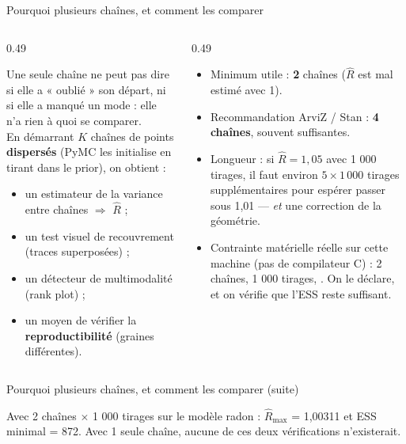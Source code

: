 \begin{frame}{Pourquoi plusieurs chaînes, et comment les comparer}
\begin{columns}[t]
\begin{column}{0.49\textwidth}
\begin{ebox}[Le principe]
Une seule chaîne ne peut pas dire si elle a « oublié » son départ, ni si elle a
manqué un mode : elle n'a rien à quoi se comparer.
\\[1mm]
En démarrant $K$ chaînes de points \textbf{dispersés} (PyMC les initialise en
tirant dans le prior), on obtient :
\begin{itemize}
  \item un estimateur de la variance entre chaînes $\Rightarrow$ $\hat R$ ;
  \item un test visuel de recouvrement (traces superposées) ;
  \item un détecteur de multimodalité (rank plot) ;
  \item un moyen de vérifier la \textbf{reproductibilité} (graines différentes).
\end{itemize}
\end{ebox}
\end{column}
\begin{column}{0.49\textwidth}
\begin{kbox}
\begin{itemize}
  \item Minimum utile : \textbf{2} chaînes ($\hat R$ est mal estimé avec 1).
  \item Recommandation ArviZ / Stan : \textbf{4 chaînes}, souvent suffisantes.
  \item Longueur : si $\hat R = 1{,}05$ avec 1 000 tirages, il faut environ
        $5 \times 1\,000$ tirages supplémentaires pour espérer passer sous
        1,01 --- \emph{et} une correction de la géométrie.
  \item Contrainte matérielle réelle sur cette machine (pas de compilateur C) :
        2 chaînes, 1 000 tirages, . On le déclare, et on vérifie
        que l'ESS reste suffisant.
\end{itemize}
\end{kbox}
\end{column}
\end{columns}
\end{frame}

\begin{frame}{Pourquoi plusieurs chaînes, et comment les comparer (suite)}
\begin{solbox}
Avec 2 chaînes $\times$ 1 000 tirages sur le modèle radon :
$\hat R_{\max}$ = 1,00311 et ESS minimal = 872.
Avec 1 seule chaîne, aucune de ces deux vérifications n'existerait.
\end{solbox}

\end{frame}


